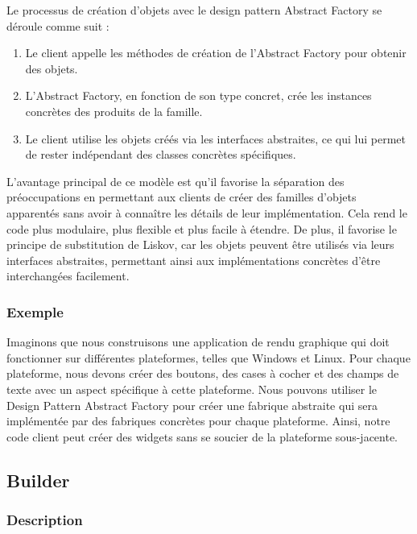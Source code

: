 \documentclass[french]{article}
\begin{document}
Le processus de création d'objets avec le design pattern Abstract Factory se déroule comme suit :

\begin{enumerate}
    \item Le client appelle les méthodes de création de l'Abstract Factory pour obtenir des objets.
    \item L'Abstract Factory, en fonction de son type concret, crée les instances concrètes des produits de la famille.
    \item Le client utilise les objets créés via les interfaces abstraites, ce qui lui permet de rester indépendant des classes concrètes spécifiques.
\end{enumerate}

L'avantage principal de ce modèle est qu'il favorise la séparation des préoccupations en permettant aux clients de créer des familles d'objets apparentés sans avoir à connaître les détails de leur implémentation. Cela rend le code plus modulaire, plus flexible et plus facile à étendre. De plus, il favorise le principe de substitution de Liskov, car les objets peuvent être utilisés via leurs interfaces abstraites, permettant ainsi aux implémentations concrètes d'être interchangées facilement.

\subsubsection{Exemple}

Imaginons que nous construisons une application de rendu graphique qui doit fonctionner sur différentes plateformes, telles que Windows et Linux. Pour chaque plateforme, nous devons créer des boutons, des cases à cocher et des champs de texte avec un aspect spécifique à cette plateforme. Nous pouvons utiliser le Design Pattern Abstract Factory pour créer une fabrique abstraite qui sera implémentée par des fabriques concrètes pour chaque plateforme. Ainsi, notre code client peut créer des widgets sans se soucier de la plateforme sous-jacente.





\newpage

\subsection{Builder}

\subsubsection{Description}
\end{document}
